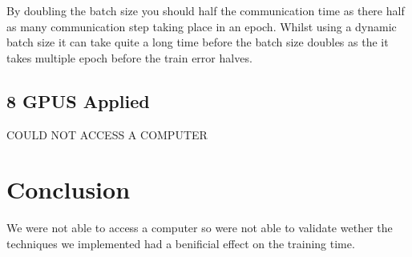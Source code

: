 \documentclass[11pt]{article}
\begin{document}
By doubling the batch size you should half the communication time as there half as many communication step taking place in an epoch. Whilst using a dynamic batch size it can take quite a long time before the batch size doubles as the it takes multiple epoch before the train error halves.


\subsection{8 GPUS Applied}
\begin{Huge}
\begin{center}
COULD NOT ACCESS A COMPUTER
\end{center}
\end{Huge}


\section{Conclusion}
We were not able to access a computer so were not able to validate wether the techniques we implemented had a benificial effect on the training time. 
\end{document}

